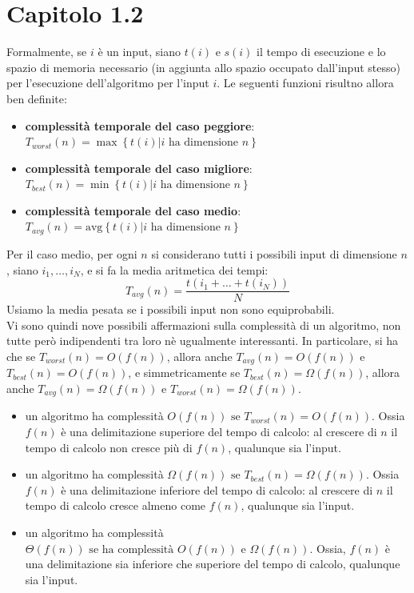\documentclass[12pt]{article}
\begin{document}
\section{Capitolo 1.2}
Formalmente, se \(i\) è un input, siano \(t(i) \text{ e } s(i)\) il tempo di esecuzione e lo spazio di memoria necessario (in aggiunta allo spazio occupato dall'input stesso) per l'esecuzione dell'algoritmo per l'input \(i\). Le seguenti funzioni risultno allora ben definite:
\begin{itemize}
    \setlength\itemsep{0em}
    \item \textbf{complessità temporale del caso peggiore}: \(T_{worst}(n) = \max\left\{t(i)|i \text{ ha dimensione }n\right\}\)
    \item \textbf{complessità temporale del caso migliore}: \(T_{best}(n) = \min\left\{t(i)|i \text{ ha dimensione }n\right\}\)
    \item \textbf{complessità temporale del caso medio}: \(T_{avg}(n) = \text{avg}\left\{t(i)|i \text{ ha dimensione }n\right\}\)
\end{itemize}
Per il caso medio, per ogni \(n\) si considerano tutti i possibili input di dimensione \(n\), siano \(i_{1},\dots, i_{N}\), e si fa la media aritmetica dei tempi:
\begin{equation}
    T_{avg}(n) = \frac{t(i_{1}+\dots+t(i_{N}))}{N}
\end{equation}
Usiamo la media pesata se i possibili input non sono equiprobabili.
\\Vi sono quindi nove possibili affermazioni sulla complessità di un algoritmo, non tutte però indipendenti tra loro nè ugualmente interessanti. In particolare, si ha che se \(T_{worst}(n)=O(f(n))\), allora anche \(T_{avg}(n)=O(f(n))\) e \(T_{best}(n)=O(f(n))\), e simmetricamente se \(T_{best}(n)=\Omega(f(n))\), allora anche \(T_{avg}(n)=\Omega(f(n))\) e \(T_{worst}(n)=\Omega(f(n))\).
\begin{itemize}
    \setlength\itemsep{0em}
    \item un algoritmo ha complessità \(O(f(n)) \text{ se } T_{worst}(n)=O(f(n))\). Ossia \(f(n)\) è una delimitazione superiore del tempo di calcolo: al crescere di \(n\) il tempo di calcolo non cresce più di \(f(n)\), qualunque sia l'input.
    \item un algoritmo ha complessità \(\Omega(f(n)) \text{ se } T_{best}(n)=\Omega(f(n))\). Ossia \(f(n)\) è una delimitazione inferiore del tempo di calcolo: al crescere di \(n\) il tempo di calcolo cresce almeno come \(f(n)\), qualunque sia l'input.
    \item un algoritmo ha complessità \(\Theta(f(n)) \text{ se ha complessità } O(f(n)) \text{ e } \Omega(f(n))\). Ossia, \(f(n)\) è una delimitazione sia inferiore che superiore del tempo di calcolo, qualunque sia l'input.
\end{itemize}
\end{document}
